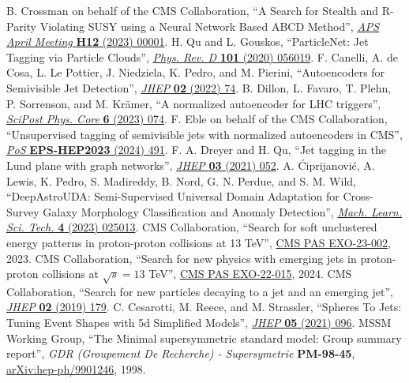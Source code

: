 \begin{thebibliography}{99}
 B. Crossman on behalf of the CMS Collaboration, ``A Search for Stealth and R-Parity Violating SUSY using a Neural Network Based ABCD Method'', \href{https://meetings.aps.org/Meeting/APR23/Session/H12.1}{\textit{APS April Meeting} \textbf{H12} (2023) 00001}.
 H. Qu and L. Gouskos, ``ParticleNet: Jet Tagging via Particle Clouds'', \href{https://doi.org/10.1103/PhysRevD.101.056019}{\textit{Phys. Rev. D} \textbf{101} (2020) 056019}.
 F. Canelli, A. de Cosa, L. Le Pottier, J. Niedziela, K. Pedro, and M. Pierini, ``Autoencoders for Semivisible Jet Detection'', \href{https://doi.org/10.1007/JHEP02(2022)074}{\textit{JHEP} \textbf{02} (2022) 74}.
 B. Dillon, L. Favaro, T. Plehn, P. Sorrenson, and M. Kr\"amer, ``A normalized autoencoder for LHC triggers'', \href{https://doi.org/10.21468/SciPostPhysCore.6.4.074}{\textit{SciPost Phys. Core} \textbf{6} (2023) 074}.
 F. Eble on behalf of the CMS Collaboration, ``Unsupervised tagging of semivisible jets with normalized autoencoders in CMS'', \href{https://doi.org/10.22323/1.449.0491}{\textit{PoS} \textbf{EPS-HEP2023} (2024) 491}.
 F. A. Dreyer and H. Qu, ``Jet tagging in the Lund plane with graph networks'', \href{https://doi.org/10.1007/JHEP03(2021)052}{\textit{JHEP} \textbf{03} (2021) 052}.
 A. \'Ciprijanovi\'c, A. Lewis, K. Pedro, S. Madireddy, B. Nord, G. N. Perdue, and S. M. Wild, ``DeepAstroUDA: Semi-Supervised Universal Domain Adaptation for Cross-Survey Galaxy Morphology Classification and Anomaly Detection'', \href{https://doi.org/10.1088/2632-2153/acca5f}{\textit{Mach. Learn. Sci. Tech.} \textbf{4} (2023) 025013}.
 CMS Collaboration, ``Search for soft unclustered energy patterns in proton-proton collisions at 13 TeV'', \href{http://cds.cern.ch/record/2883117}{CMS PAS EXO-23-002}, 2023.
 CMS Collaboration, ``Search for new physics with emerging jets in proton-proton collisions at $\sqrt{s}=13$ TeV'', \href{https://cds.cern.ch/record/2889672}{CMS PAS EXO-22-015}, 2024.
 CMS Collaboration, ``Search for new particles decaying to a jet and an emerging jet'', \href{https://doi.org/10.1007/JHEP02(2019)179}{\textit{JHEP} \textbf{02} (2019) 179}.
 C. Cesarotti, M. Reece, and M. Strassler, ``Spheres To Jets: Tuning Event Shapes with 5d Simplified Models'', \href{https://doi.org/10.1007/JHEP05(2021)096}{\textit{JHEP} \textbf{05} (2021) 096}.
 MSSM Working Group, ``The Minimal supersymmetric standard model: Group summary report'', \textit{GDR (Groupement De Recherche) - Supersymetrie} \textbf{PM-98-45}, \href{https://arxiv.org/abs/hep-ph/9901246}{arXiv:hep-ph/9901246}, 1998.

\end{thebibliography}
